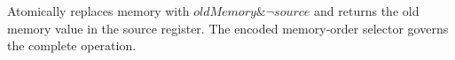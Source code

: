 Atomically replaces memory with \(\mathit{oldMemory} \mathbin{\&} \lnot \mathit{source}\) and returns the old memory
value in the source register. The encoded memory-order selector governs the complete operation.
